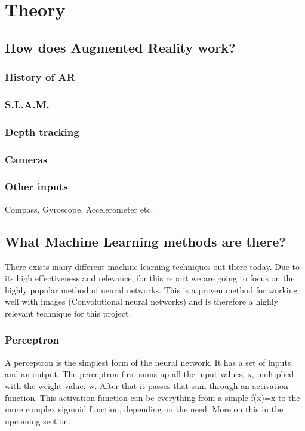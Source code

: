 \section{Theory}

\subsection{How does Augmented Reality work?}

\subsubsection{History of AR}

\subsubsection{S.L.A.M.}

\subsubsection{Depth tracking}

\subsubsection{Cameras}

\subsubsection{Other inputs}
Compass, Gyroscope, Accelerometer  etc.

\subsection{What Machine Learning methods are there?}
There exists many different machine learning techniques out there today. Due to its high effectiveness and relevance, for this report we are going to focus on the highly popular method of neural networks.
This is a proven method for working well with images (Convolutional neural networks) and is therefore a highly 
relevant technique for this project.

\subsubsection{Perceptron}
A perceptron is the simplest form of the neural network. It has a set of inputs and an output.
The perceptron first sums up all the input values, x, multiplied with the weight value, w.
After that it passes that sum through an activation function. This activation function can be everything from a simple f(x)=x to the more complex sigmoid function, depending on the need. More on this in the upcoming section.

